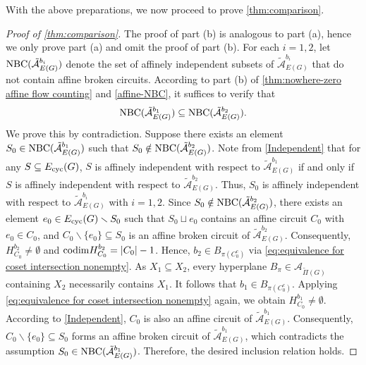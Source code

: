 \documentclass[12pt]{article}%
\renewcommand*{\bm}[1]{#1}%
\numberwithin{equation}{section}
\begin{document}
With the above preparations, we now proceed to prove \autoref{thm:comparison}.
\begin{proof}[Proof of \autoref{thm:comparison}]
The proof of part (b) is analogous to part (a), hence we only prove part (a) and omit the proof of part (b). For each $i=1,2$, let ${\rm NBC}(\tilde{\mathcal{A}}_{E(G)}^{\bm b_i})$ denote the set of affinely independent subsets of $\tilde{\mathcal{A}}_{E(G)}^{\bm b_i}$ that do not contain affine broken circuits. According to part (b) of \autoref{thm:nowhere-zero affine flow counting} and \autoref{affine-NBC}, it suffices to verify that 
\[
{\rm NBC}(\tilde{\mathcal{A}}_{E(G)}^{\bm b_1})\subseteq {\rm NBC}(\tilde{\mathcal{A}}_{E(G)}^{\bm b_2}).
\]
We prove this by contradiction. Suppose there exists an element $S_0\in {\rm NBC}(\tilde{\mathcal{A}}_{E(G)}^{\bm b_1})$ such that $S_0\notin{\rm NBC}(\tilde{\mathcal{A}}_{E(G)}^{\bm b_2})$. Note from \autoref{Independent} that for any $S\subseteq E_{\rm cyc}(G)$, $S$ is affinely independent with respect to $\tilde{\mathcal{A}}_{E(G)}^{\bm b_1}$ if and only if $S$ is affinely independent with respect to $\tilde{\mathcal{A}}_{E(G)}^{\bm b_2}$. Thus, $S_0$ is affinely independent with respect to $\tilde{\mathcal{A}}_{E(G)}^{\bm b_i}$ with $i=1,2$. Since $S_0\notin{\rm NBC}(\tilde{\mathcal{A}}_{E(G)}^{\bm b_2})$, there exists an element $e_0\in E_{\rm cyc}(G)\smallsetminus S_0$ such that $S_0\sqcup e_0$ contains an affine circuit $C_0$ with $e_0\in C_0$, and $C_0\smallsetminus \{e_0\}\subseteq S_0$ is an affine broken circuit of $\tilde{\mathcal{A}}_{E(G)}^{\bm b_2}$. Consequently, $H_{C_0}^{\bm b_2}\ne\emptyset$ and ${\rm codim}H_{C_0}^{\bm b_2}=|C_0|-1$. Hence, $\bm b_2\in B_{\pi(C_0^c)}$ via \eqref{eq:equivalence for coset intersection nonempty}. As $X_1\subseteq X_2$, every hyperplane $B_\pi\in\mathcal{A}_{\tilde{\Pi}(G)}$ containing $X_2$ necessarily contains $X_1$. It follows that  $\bm b_1\in B_{\pi(C_0^c)}$. Applying  \eqref{eq:equivalence for coset intersection nonempty} again, we obtain $H_{C_0}^{\bm b_1}\ne\emptyset$. According to \autoref{Independent}, $C_0$ is also an affine circuit of $\tilde{\mathcal{A}}_{E(G)}^{\bm b_1}$. Consequently, $C_0\smallsetminus \{e_0\}\subseteq S_0$ forms an affine broken circuit of $\tilde{\mathcal{A}}_{E(G)}^{\bm b_1}$, which contradicts the assumption $S_0\in {\rm NBC}(\tilde{\mathcal{A}}_{E(G)}^{\bm b_1})$. Therefore, the desired inclusion relation holds. 
\end{proof}
\end{document}
